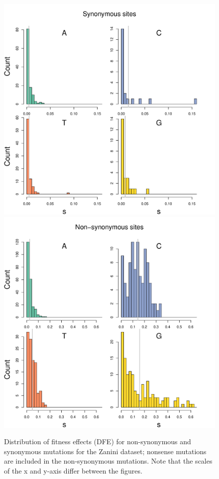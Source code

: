 \documentclass{article}
\begin{document}
\begin{figure}[ht!]
\centering
\includegraphics[scale = .45]{F3-Zanini-syn.pdf}
\includegraphics[scale = .45]{F3-Zanini-nonsyn.pdf}
\caption{Distribution of fitness effects (DFE) for non-synonymous and synonymous mutations for the Zanini dataset; nonsense mutations are included in the non-synonymous mutations. Note that the scales of the x and y-axis differ between the figures.}
\label{Zanininonsyn}
\end{figure}
\end{document}
